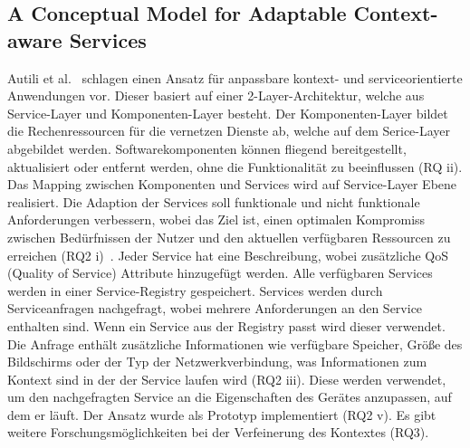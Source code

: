 \documentclass[conference,compsoc]{IEEEtran}
\begin{document}
\subsection{A Conceptual Model for Adaptable Context-aware Services}
Autili et al.~\cite{autili2006conceptual} schlagen einen Ansatz für anpassbare kontext- und serviceorientierte Anwendungen vor. Dieser basiert auf einer 2-Layer-Architektur, welche aus Service-Layer und Komponenten-Layer besteht. Der Komponenten-Layer bildet die Rechenressourcen für die vernetzen Dienste ab, welche auf dem Serice-Layer abgebildet werden. Softwarekomponenten können fliegend bereitgestellt, aktualisiert oder entfernt werden, ohne die Funktionalität zu beeinflussen (RQ ii). Das Mapping zwischen Komponenten und Services wird auf Service-Layer Ebene realisiert.
Die Adaption der Services soll funktionale und nicht funktionale Anforderungen verbessern, wobei das Ziel ist, einen optimalen Kompromiss zwischen Bedürfnissen der Nutzer und den aktuellen verfügbaren Ressourcen zu erreichen (RQ2 i)~\cite{autili2006conceptual}. Jeder Service hat eine Beschreibung, wobei zusätzliche QoS (Quality of Service) Attribute hinzugefügt werden. Alle verfügbaren Services werden in einer Service-Registry gespeichert. Services werden durch Serviceanfragen nachgefragt, wobei mehrere Anforderungen an den Service enthalten sind. Wenn ein Service aus der Registry passt wird dieser verwendet. Die Anfrage enthält zusätzliche Informationen wie verfügbare Speicher, Größe des Bildschirms oder der Typ der Netzwerkverbindung, was Informationen zum Kontext sind in der der Service laufen wird (RQ2 iii). Diese werden verwendet, um den nachgefragten Service an die Eigenschaften des Gerätes anzupassen, auf dem er läuft.
Der Ansatz wurde als Prototyp implementiert (RQ2 v). Es gibt weitere Forschungsmöglichkeiten bei der Verfeinerung des Kontextes (RQ3).
\end{document}
